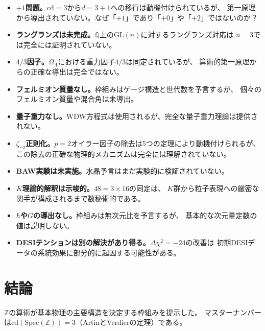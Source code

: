 \documentclass[12pt,a4paper]{article}
\theoremstyle{definition}
\newcommand{\Spec}{\mathrm{Spec}}
\newcommand{\cd}{\mathrm{cd}}
\newcommand{\GL}{\mathrm{GL}}
\newcommand{\Z}{\mathbb{Z}}
\newcommand{\Q}{\mathbb{Q}}
\newcommand{\OmL}{\Omega_\Lambda}
\newcommand{\zetanot}{\zeta_{\neg 2}}
\begin{document}
\begin{itemize}
\item \textbf{$+1$問題。}$\cd=3$から$d=3+1$への移行は動機付けられているが、
  第一原理から導出されていない。なぜ「$+1$」であり「$+0$」や「$+2$」ではないのか？

\item \textbf{ラングランズは未完成。}$\Q$上の$\GL(n)$に対するラングランズ対応は
  $n=3$では完全には証明されていない。

\item \textbf{$4/3$因子。}$\OmL$における重力因子$4/3$は同定されているが、
  算術的第一原理からの正確な導出は完全ではない。

\item \textbf{フェルミオン質量なし。}枠組みはゲージ構造と世代数を予言するが、
  個々のフェルミオン質量や混合角は未導出。

\item \textbf{量子重力なし。}WDW方程式は使用されるが、完全な量子重力理論は提供されない。

\item \textbf{$\zetanot$正則化。}$p=2$オイラー因子の除去は5つの定理により動機付けられるが、
  この除去の正確な物理的メカニズムは完全には理解されていない。

\item \textbf{BAW実験は未実施。}水晶予言はまだ実験的に検証されていない。

\item \textbf{$K$理論的解釈は示唆的。}$48=3\times 16$の同定は、
  $K$群から粒子表現への厳密な関手が構成されるまで数秘術的である。

\item \textbf{$\hbar$や$G$の導出なし。}枠組みは無次元比を予言するが、
  基本的な次元量定数の値は説明しない。

\item \textbf{DESIテンションは別の解決があり得る。}$\Delta\chi^2=-24$の改善は
  初期DESIデータの系統効果に部分的に起因する可能性がある。
\end{itemize}

\section{結論}\label{sec:conclusion}

$\Z$の算術が基本物理の主要構造を決定する枠組みを提示した。
マスターナンバーは$\cd(\Spec(\Z))=3$（ArtinとVerdierの定理）である。
\end{document}
